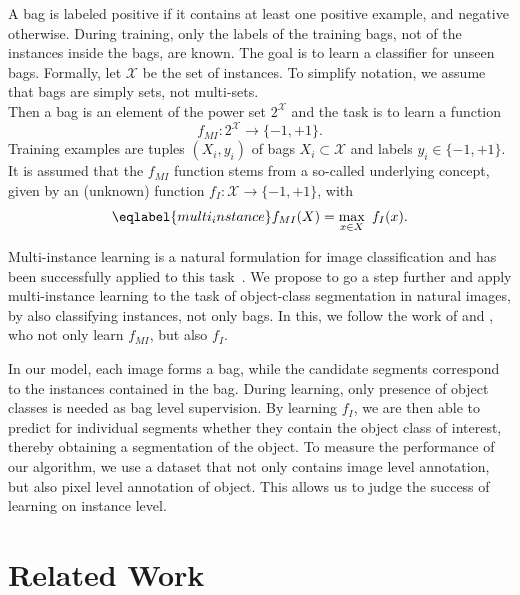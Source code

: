 A bag is labeled positive if it contains at least one positive example, and
negative otherwise.  During training, only the labels of the training bags, not
of the instances inside the bags, are known.  The goal is to learn a classifier
for unseen bags. 
Formally, let $\mathcal{X}$ be the set of instances. To simplify notation, we
assume that bags are simply sets, not multi-sets.
\pagebreak\\
Then a bag is an element of
the power set $2^\mathcal{X}$ and the task is to learn a function
\begin{equation} f_{MI} \colon 2^\mathcal{X} \rightarrow \{-1,+1\}.  \end{equation}
Training examples are tuples $(X_i,y_i)$ of bags $X_i \subset \mathcal{X}$ and
labels $y_i \in \{-1,+1\}$.  It is assumed that the $f_{MI}$ function stems
from a so-called underlying concept, given by an (unknown) function
$f_{I} \colon \mathcal{X} \rightarrow \{-1,+1\}$, with 
\begin{equation}\eqlabel{multi_instance}
f_{MI}(X)= \max_{x \in X}\ f_{I}(x).
\end{equation}

Multi-instance learning is a natural formulation for image classification and
has been successfully applied to this task~\citep{zhou2007multi}. We propose to
go a step further and apply multi-instance learning to the task of object-class
segmentation in natural images, by also classifying instances, not only bags.
In this, we follow the work of \citet{liconvex2010} and \citet{zha2008joint}, who not
only learn $f_{MI}$, but also $f_{I}$.

In our model, each image forms a bag, while the candidate segments correspond
to the instances contained in the bag. During learning, only presence of object
classes is needed as bag level supervision. By learning $f_{I}$, we are then
able to predict for individual segments whether they contain the object class
of interest, thereby obtaining a segmentation of the object.
To measure the performance of our algorithm, we use a dataset that not only contains
image level annotation, but also pixel level annotation of object. This allows
us to judge the success of learning on instance level.

\section{Related Work}

